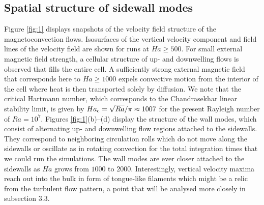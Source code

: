 \documentclass{jfm}
\begin{document}
\subsection{Spatial structure of sidewall modes} 
Figure \ref{fig:1} displays snapshots of the velocity field structure of the magnetoconvection flows. Isosurfaces of
the vertical velocity component and field lines of the velocity field are shown for runs at $Ha\ge 500$. For small
external magnetic field strength, a cellular structure of up- and downwelling flows is observed that fills the entire cell.
A sufficiently strong external magnetic field that corresponds here to $Ha \ge 1000$ expels convective motion from
the interior of the cell where heat is then transported solely by diffusion. We note that the critical Hartmann number,
which corresponds to the Chandrasekhar linear stability limit, is given by $Ha_{\rm c} = \sqrt{Ra}/\pi \approx 1007$ for the present
Rayleigh number of $Ra = 10^7$. Figures \ref{fig:1}(b)--(d) display the structure of the wall modes, which consist of alternating
up- and downwelling flow regions attached to the sidewalls. They correspond to neighboring circulation rolls which
do not move along the sidewalls or oscillate as in rotating convection for the total integration times that we could run the simulations. 
The wall modes are ever closer attached to the sidewalls
as $Ha$ grows from $1000$ to $2000$. Interestingly, vertical velocity maxima reach out into the bulk in form of tongue-like
filaments which might be a relic from the turbulent flow pattern, a point that will be analysed more closely in subsection 3.3.
\end{document}
